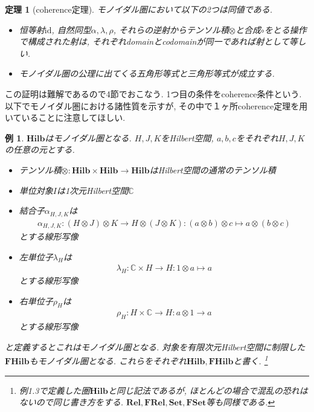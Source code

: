 \documentclass[a4paper,12pt]{ltjsarticle}
\theoremstyle{break}
\newtheorem{thrm}[thm]{定理}
\newtheorem{eg}[thm]{例}
\newcommand{\cset}{\mathbf{Set}}
\newcommand{\fset}{\mathbf{FSet}}
\newcommand{\rel}{\mathbf{Rel}}
\newcommand{\frel}{\mathbf{FRel}}
\newcommand{\hilb}{\mathbf{Hilb}}
\newcommand{\fhilb}{\mathbf{FHilb}}
\newcommand{\mbc}{\mathbb{C}}
\newcommand{\id}{\mathrm{id}}
\newcommand{\al}{\alpha}
\newcommand{\la}{\lambda}
\newcommand{\mt}{\mapsto}
\newcommand{\ot}{\otimes}
\newcommand{\ti}{\times}
\numberwithin{equation}{section}
\begin{document}
\begin{thrm}[coherence定理]
  モノイダル圏において以下の2つは同値である. 
  \begin{itemize}
    \item 恒等射$\id$, 自然同型$\al,\la,\rho$, それらの逆射からテンソル積$\ot$と合成$\circ$をとる操作で構成された射は, それぞれdomainとcodomainが同一であれば射として等しい. 
    \item モノイダル圏の公理に出てくる五角形等式と三角形等式が成立する. 
  \end{itemize}
\end{thrm}

この証明は難解であるので4節でおこなう. 
1つ目の条件をcoherence条件という. 
以下でモノイダル圏における諸性質を示すが, その中で１ヶ所coherence定理を用いていることに注意してほしい. 

\begin{eg}
  $\hilb$はモノイダル圏となる. $H,J,K$をHilbert空間, $a,b,c$をそれぞれ$H,J,K$の任意の元とする. 
  \begin{itemize}
    \item テンソル積$\ot : \hilb \ti \hilb \to \hilb$はHilbert空間の通常のテンソル積
    \item 単位対象$I$は1次元Hilbert空間$\mbc$
    \item 結合子$\al_{H,J,K}$は
    \begin{align*}
      \al_{H,J,K}: (H \ot J) \ot K \to H \ot (J \ot K): (a \ot b) \ot c \mt a \ot (b \ot c)
    \end{align*}
    とする線形写像
    \item 左単位子$\la_H$は
    \begin{align*}
      \la_H: \mbc \ti H \to H: 1 \ot a \mt a
    \end{align*}
    とする線形写像
    \item 右単位子$\rho_H$は
    \begin{align*}
      \rho_H: H \ti \mbc  \to H: a \ot 1 \to a
    \end{align*}
    とする線形写像
  \end{itemize}
  と定義するとこれはモノイダル圏となる. 
  対象を有限次元Hilbert空間に制限した$\fhilb$もモノイダル圏となる. 
  これらをそれぞれ$\hilb, \fhilb$と書く. 
  \footnote{
      例1.3で定義した圏$\hilb$と同じ記法であるが, ほとんどの場合で混乱の恐れはないので同じ書き方をする. 
      $\rel, \frel, \cset, \fset$等も同様である. 
    } 
\end{eg} 

\end{document}

